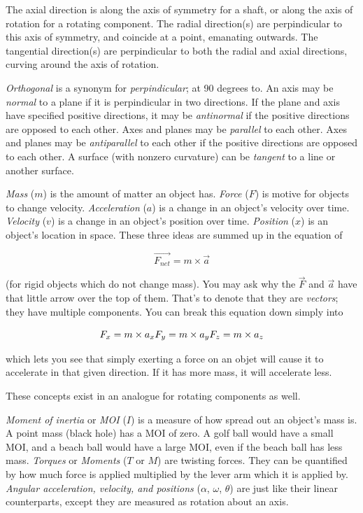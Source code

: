 The axial direction is along the axis of symmetry for a shaft, or along the axis of rotation for a rotating component.
The radial direction(s) are perpindicular to this axis of symmetry, and coincide at a point, emanating outwards.
The tangential direction(s) are perpindicular to both the radial and axial directions, curving around the axis of rotation.

\textit{Orthogonal} is a synonym for \textit{perpindicular}; at 90 degrees to.
An axis may be \textit{normal} to a plane if it is perpindicular in two directions.
If the plane and axis have specified positive directions, it may be \textit{antinormal} if the positive directions are opposed to each other.
Axes and planes may be \textit{parallel} to each other.
Axes and planes may be \textit{antiparallel} to each other if the positive directions are opposed to each other.
A surface (with nonzero curvature) can be \textit{tangent} to a line or another surface.

\textit{Mass} ($m$) is the amount of matter an object has.
\textit{Force} ($F$) is motive for objects to change velocity.
\textit{Acceleration} ($a$) is a change in an object's velocity over time.
\textit{Velocity} ($v$) is a change in an object's position over time.
\textit{Position} ($x$) is an object's location in space.
These three ideas are summed up in the equation of

\begin{equation}
	\vec{F_{net}} = m \times \vec{a}
\end{equation}

(for rigid objects which do not change mass). You may ask why the $\vec{F}$ and $\vec{a}$ have that little arrow over the top of them. That's to denote that they are \textit{vectors}; they have multiple components. You can break this equation down simply into

\begin{equation}
	F_x = m \times a_x \\
	F_y = m \times a_y \\
	F_z = m \times a_z
\end{equation}

which lets you see that simply exerting a force on an objet will cause it to accelerate in that given direction. If it has more mass, it will accelerate less.

These concepts exist in an analogue for rotating components as well.

\textit{Moment of inertia} or \textit{MOI} ($I$) is a measure of how spread out an object's mass is. A point mass (black hole) has a MOI of zero. A golf ball would have a small MOI, and a beach ball would have a large MOI, even if the beach ball has less mass.
\textit{Torques} or \textit{Moments} ($T$ or $M$) are twisting forces. They can be quantified by how much force is applied multiplied by the lever arm which it is applied by.
\textit{Angular acceleration, velocity, and positions} ($\alpha$, $\omega$, $\theta$) are just like their linear counterparts, except they are measured as rotation about an axis.

